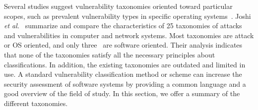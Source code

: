




Several studies suggest vulnerability taxonomies oriented toward particular scopes, such as prevalent vulnerability types in specific operating systems~\cite{Tate2020CharacterizingVI}. Joshi \textit{et al.}~\cite{Joshi2015ARO} summarize and compare the characteristics of 25 taxonomies of attacks and vulnerabilities in computer and network systems. Most taxonomies are attack or OS oriented, and only three~\cite{Bazaz2007TowardsAT, Piessens2002ATO, Weber2005ASF} are software oriented. Their analysis indicates that none of the taxonomies satisfy all the necessary principles about classifications. In addition, the existing taxonomies are outdated and limited in use. A standard vulnerability classification method or scheme can increase the security assessment of software systems by providing a common language and a good overview of the field of study. In this section, we offer a summary of the different taxonomies.

